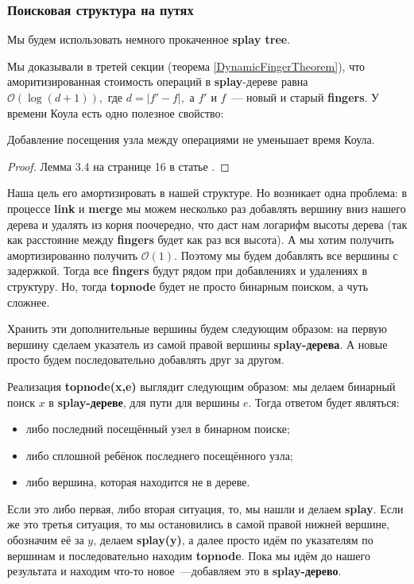 \subsubsection{Поисковая структура на путях}
Мы будем использовать немного прокаченное \textbf{splay tree}. 

Мы доказывали в третей секции (теорема \ref{DynamicFingerTheorem}), что аморитизированная стоимость операций в \textbf{splay}-дереве равна $\mathcal{O}(\log{(d + 1)}),$ где $d = |f' - f|,$ а $f'$ и $f$~--- новый и старый \textbf{fingers}.
У времени Коула есть одно полезное свойство:
\begin{lemma}
Добавление посещения узла между операциями не уменьшает время Коула.
\end{lemma}
\begin{proof}
Лемма 3.4 на странице 16 в статье \cite{georgiadis2011data}.
\end{proof}
Наша цель его амортизировать в нашей структуре. Но возникает одна проблема: в процессе \textbf{link} и \textbf{merge} мы можем несколько раз добавлять вершину вниз нашего дерева и удалять из корня поочередно, что даст нам логарифм высоты дерева (так как расстояние между \textbf{fingers} будет как раз вся высота). А мы хотим получить амортизированно получить $\mathcal{O}(1).$ Поэтому мы будем добавлять все вершины с задержкой. Тогда все \textbf{fingers} будут рядом при добавлениях и удалениях в структуру. Но, тогда \textbf{topnode} будет не просто бинарным поиском, а чуть сложнее.

Хранить эти дополнительные вершины будем следующим образом: на первую вершину сделаем указатель из самой правой вершины \textbf{splay-дерева}. А новые просто будем последовательно добавлять друг за другом.

Реализация \textbf{topnode(x,e)} выглядит следующим образом: мы делаем бинарный поиск $x$ в \textbf{splay-дереве}, для пути для вершины $e$. Тогда ответом будет являться:
\begin{itemize}
    \item либо последний посещённый узел в бинарном поиске;
    \item либо сплошной ребёнок последнего посещённого узла;
    \item либо вершина, которая находится не в дереве.
\end{itemize}
Если это либо первая, либо вторая ситуация, то, мы нашли и делаем \textbf{splay}. Если же это третья ситуация, то мы остановились в самой правой нижней вершине, обозначим её за $y$, делаем \textbf{splay(y)}, а далее просто идём по указателям по вершинам и последовательно находим \textbf{topnode}. Пока мы идём до нашего результата и находим что-то новое~---добавляем это в \textbf{splay-дерево}.

